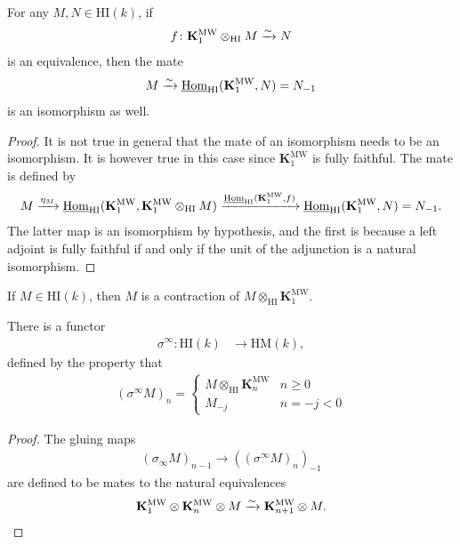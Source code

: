 \documentclass[11pt,openany]{book}
\providecommand{\HI}{\mathrm{HI}}
\providecommand{\HM}{\mathrm{HM}}
\providecommand{\KMW}{\mathbf{K}^\mathrm{MW}}
\begin{document}
\begin{corollary} For any $M,N \in \HI(k)$, if
\begin{align*}
    f\colon \KMW_1 \otimes_\HI M \xto{\sim} N
\end{align*}
is an equivalence, then the mate
\begin{align*}
    M \xto{\sim} \underline{\Hom}_\HI(\KMW_1,N) = N_{-1}
\end{align*}
is an isomorphism as well.
\end{corollary}
\begin{proof} It is not true in general that the mate of an isomorphism needs to be an isomorphism. It is however true in this case since $\KMW_1$ is fully faithful. The mate is defined by
\begin{align*}
    M \xto{\eta_M} \underline{\Hom}_\HI(\KMW_1, \KMW_1 \otimes_\HI M) \xto{\underline{\Hom}_\HI(\KMW_1,f)} \underline{\Hom}_\HI(\KMW_1,N) = N_{-1}.
\end{align*}
The latter map is an isomorphism by hypothesis, and the first is because a left adjoint is fully faithful if and only if the unit of the adjunction is a natural isomorphism.
\end{proof}



\begin{corollary} If $M \in \HI(k)$, then $M$ is a contraction of $M \otimes_\HI \KMW_1$.
\end{corollary}

\begin{proposition} There is a functor
\begin{align*}
    \sigma^\infty \colon \HI(k) &\to \HM(k),
\end{align*}
defined by the property that 
\begin{align*}
    (\sigma^\infty M)_n = \begin{cases} 
    M \otimes_\HI \KMW_n & n\ge 0 \\
    M_{-j} & n=-j < 0 \end{cases}
\end{align*}
\end{proposition}
\begin{proof} The gluing maps
\begin{align*}
    (\sigma_\infty M)_{n-1} \to \left( (\sigma^\infty M)_n \right)_{-1}
\end{align*}
are defined to be mates to the natural equivalences
\begin{align*}
    \KMW_1 \otimes \KMW_n \otimes M \xto{\sim} \KMW_{n+1} \otimes M.
\end{align*}
\end{proof}
\end{document}
